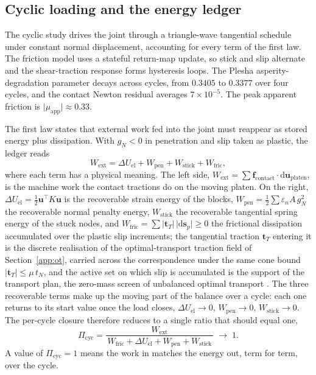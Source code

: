 \documentclass{svjour3}                 %
\newcommand{\abs}[1]{\lvert#1\rvert}
\newcommand{\tbf}{\bm{t}}
\newcommand{\ubf}{\bm{u}}
\newcommand{\fbf}{\bm{f}}
\newcommand{\gn}{g_{\scriptscriptstyle N}}
\newcommand{\muapp}{\mu_{\mathrm{app}}}
\begin{document}
\begin{appendix}
\subsection{Cyclic loading and the energy ledger}\label{app:supp:p4}

The cyclic study drives the joint through a triangle-wave tangential schedule under constant normal
displacement, accounting for every term of the first law. The friction model uses a stateful
return-map update, so stick and slip alternate and the shear-traction response forms hysteresis loops.
The Plesha asperity-degradation parameter decays across cycles, from $0.3405$ to $0.3377$ over four
cycles, and the contact Newton residual averages $7\times10^{-5}$. The peak apparent friction is
$\abs{\muapp}\approx0.33$.

The first law states that external work fed into the joint must reappear as stored energy plus
dissipation. With $\gn<0$ in penetration and slip taken as plastic, the ledger reads
%
\begin{equation}\label{eq:supp_ledger}
W_{\mathrm{ext}}
= \Delta U_{\mathrm{el}}
+ W_{\mathrm{pen}}
+ W_{\mathrm{stick}}
+ W_{\mathrm{fric}},
\end{equation}
%
where each term has a physical meaning. The left side, $W_{\mathrm{ext}}=\sum \fbf_{\mathrm{contact}}\cdot
\mathrm{d}\ubf_{\mathrm{platen}}$, is the machine work the contact tractions do on the moving platen. On
the right, $\Delta U_{\mathrm{el}}=\tfrac12\ubf^{\!\top}\!K\ubf$ is the recoverable strain energy of the
blocks, $W_{\mathrm{pen}}=\tfrac12\sum\varepsilon_n A\,\gn^{2}$ the recoverable normal penalty energy,
$W_{\mathrm{stick}}$ the recoverable tangential spring energy of the stuck nodes, and
$W_{\mathrm{fric}}=\sum\abs{\tbf_T}\,\abs{\mathrm{d}\bm{s}_p}\ge0$ the frictional dissipation
accumulated over the plastic slip increments; the tangential traction $\tbf_T$ entering it is the discrete
realisation of the optimal-transport traction field of Section~\ref{app:ot}, carried across the
correspondence under the same cone bound $\abs{\tbf_T}\le\mu\,t_N$, and the active set on which slip is
accumulated is the support of the transport plan, the zero-mass screen of unbalanced optimal transport
\citep{chizat2018unbalanced}. The three recoverable terms make up the moving part of the
balance over a cycle: each one returns to its start value once the load closes,
$\Delta U_{\mathrm{el}}\to0$, $W_{\mathrm{pen}}\to0$, $W_{\mathrm{stick}}\to0$. The per-cycle closure
therefore reduces to a single ratio that should equal one,
%
\begin{equation}\label{eq:supp_closure}
\Pi_{\mathrm{cyc}}
= \frac{W_{\mathrm{ext}}}
{\,W_{\mathrm{fric}}+\Delta U_{\mathrm{el}}+W_{\mathrm{pen}}+W_{\mathrm{stick}}\,}
\;\longrightarrow\; 1 .
\end{equation}
%
A value of $\Pi_{\mathrm{cyc}}=1$ means the work in matches the energy out, term for term, over the cycle.


\end{appendix}
\end{document}
